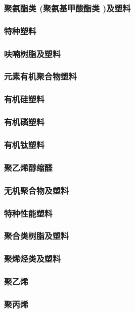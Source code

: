 \documentclass[UTF8]{../../ApplicationUniverse}
\begin{document}
    \subsubsection{聚氨酯类 (聚氨基甲酸酯类 )及塑料}
\subsubsection{特种塑料}
    \subsubsection{呋喃树脂及塑料}
    \subsubsection{元素有机聚合物塑料}
        \subsubsection{有机硅塑料}
        \subsubsection{有机磷塑料}
        \subsubsection{有机钛塑料}
    \subsubsection{聚乙烯醇缩醛}
    \subsubsection{无机聚合物及塑料}
    \subsubsection{特种性能塑料}
\subsubsection{聚合类树脂及塑料}
    \subsubsection{聚烯烃类及塑料}
        \subsubsection{聚乙烯}
        \subsubsection{聚丙烯}
\end{document}
